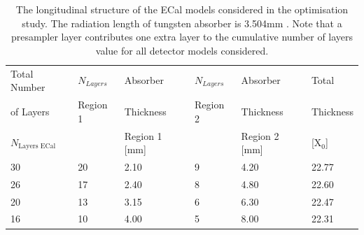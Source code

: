 \begin{table}[h!]
\centering
\begin{tabular}{ l l l l l l}
\hline
Total Number & $N_{Layers}$ & Absorber & $N_{Layers}$ & Absorber & Total  \\
of Layers & Region 1 & Thickness & Region 2 & Thickness & Thickness \\
$N_{\text{Layers ECal}}$ & & Region 1 [mm] & &  Region 2 [mm] &  [$\text{X}_{0}$] \\
\hline
30 & 20 & 2.10 & 9 & 4.20 & 22.77 \\
26 & 17 & 2.40 & 8 & 4.80 & 22.60 \\
20 & 13 & 3.15 & 6 & 6.30 & 22.47 \\
16 & 10 & 4.00 & 5 & 8.00 & 22.31\\
\hline
\end{tabular}
\caption[The longitudinal structure of the ECal models considered in the optimisation study.  The radiation length of tungsten absorber is 3.504mm \cite{Olive:2016xmw}.  Note that a presampler layer contributes one extra layer to the cumulative number of layers value for all detector models considered.]{The longitudinal structure of the ECal models considered in the optimisation study.  The radiation length of tungsten absorber is 3.504mm \cite{Olive:2016xmw}.  Note that a presampler layer contributes one extra layer to the cumulative number of layers value for all detector models considered.}
\label{table:nlayersecaloption}
\end{table}

